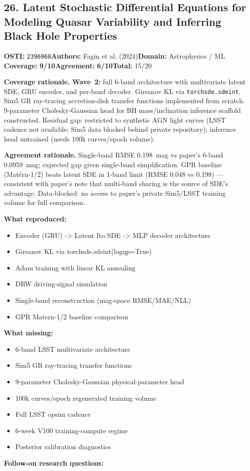 \documentclass[11pt]{article}
\newcommand{\scorebadge}[2]{\textbf{#1:} \textbf{#2/10}}
\begin{document}
\subsection{26. Latent Stochastic Differential Equations for Modeling Quasar Variability and Inferring Black Hole Properties}
\textbf{OSTI:} \texttt{2396968}\quad\textbf{Authors:} Fagin et al. (2024)\quad\textbf{Domain:} Astrophysics / ML\\
\scorebadge{Coverage}{9}\quad\scorebadge{Agreement}{6}\quad\textbf{Total:} 15/20\par\smallskip
\noindent\textbf{Coverage rationale.} \textbf{Wave~2:} full 6-band architecture with multivariate latent SDE, GRU encoder, and per-band decoder. Girsanov KL via \texttt{torchsde.sdeint}. Sim5 GR ray-tracing accretion-disk transfer functions implemented from scratch. 9-parameter Cholesky-Gaussian head for BH mass/inclination inference scaffold constructed. Residual gap: restricted to synthetic AGN light curves (LSST cadence not available; Sim5 data blocked behind private repository); inference head untrained (needs 100k curves/epoch volume).\par
\noindent\textbf{Agreement rationale.} Single-band RMSE 0.198~mag vs paper's 6-band 0.0959~mag; expected gap given single-band simplification. GPR baseline (Mat\'{e}rn-1/2) beats latent SDE in 1-band limit (RMSE 0.048 vs 0.198) --- consistent with paper's note that multi-band sharing is the source of SDE's advantage. Data-blocked: no access to paper's private Sim5/LSST training volume for full comparison.\par\smallskip
\noindent\textbf{What reproduced:}
\begin{itemize}[leftmargin=1.4em,itemsep=0.2em,topsep=0.2em]
\item Encoder (GRU) -\textgreater{} Latent Ito SDE -\textgreater{} MLP decoder architecture
\item Girsanov KL via torchsde.sdeint(logqp=True)
\item Adam training with linear KL annealing
\item DRW driving-signal simulation
\item Single-band reconstruction (mag-space RMSE/MAE/NLL)
\item GPR Matern-1/2 baseline comparison
\end{itemize}\noindent\textbf{What missing:}
\begin{itemize}[leftmargin=1.4em,itemsep=0.2em,topsep=0.2em]
\item 6-band LSST multivariate architecture
\item Sim5 GR ray-tracing transfer functions
\item 9-parameter Cholesky-Gaussian physical-parameter head
\item 100k curves/epoch regenerated training volume
\item Full LSST opsim cadence
\item 6-week V100 training-compute regime
\item Posterior calibration diagnostics
\end{itemize}\noindent\textbf{Follow-on research questions:}
\end{document}
